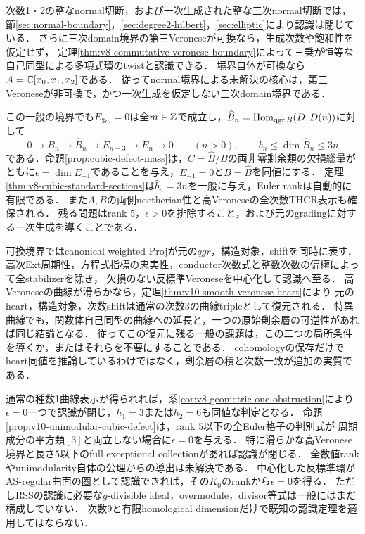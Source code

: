 \documentclass[11pt,a4paper]{ltjsarticle}
\begin{document}
次数1・2の整なnormal切断，および一次生成された整な三次normal切断では，
節\ref{sec:normal-boundary}，\ref{sec:degree2-hilbert}，\ref{sec:elliptic}により認識は閉じている．
さらに三次domain境界の第三Veroneseが可換なら，生成次数や飽和性を仮定せず，
定理\ref{thm:v8-commutative-veronese-boundary}によって三乗が恒等な自己同型による多項式環のtwistと認識できる．
境界自体が可換なら$A=\mathbb C[x_0,x_1,x_2]$である．
従ってnormal境界による未解決の核心は，第三Veroneseが非可換で，かつ一次生成を仮定しない三次domain境界である．

この一般の境界でも$E_{3m}=0$は全$m\in\mathbb Z$で成立し，$\widehat B_n=\operatorname{Hom}_{\operatorname{qgr} B}(D,D(n))$に対して
\[
 0\longrightarrow B_n\longrightarrow\widehat B_n
 \longrightarrow E_{n-3}\longrightarrow E_n\longrightarrow0\qquad(n>0),
 \qquad b_n\leq\dim\widehat B_n\leq3n
\]
である．命題\ref{prop:cubic-defect-mass}は，$C=\widehat B/B$の両非零剰余類の欠損総量が
ともに$\epsilon=\dim E_{-1}$であることを与え，$E_{-1}=0$と$B=\widehat B$を同値にする．
定理\ref{thm:v8-cubic-standard-sections}は$\widehat b_n=3n$を一般に与え，Euler rankは自動的に有限である．
また$A,B$の両側noetherian性と高Veroneseの全次数THCR表示も確保される．
残る問題はrank $5$，$\epsilon>0$を排除すること，および元のgradingに対する一次生成を導くことである．

可換境界ではcanonical weighted Projが元の$qgr$，構造対象，shiftを同時に表す．
高次Ext周期性，方程式指標の忠実性，conductor次数式と整数次数の偏極によって全stabilizerを除き，
欠損のない反標準Veroneseを中心化して認識へ至る．
高Veroneseの曲線が滑らかなら，定理\ref{thm:v10-smooth-veronese-heart}により
元のheart，構造対象，次数shiftは通常の次数3の曲線tripleとして復元される．
特異曲線でも，関数体自己同型の曲線への延長と，一つの原始剰余層の可逆性があれば同じ結論となる．
従ってこの復元に残る一般の課題は，この二つの局所条件を導くか，またはそれらを不要にすることである．
cohomologyの保存だけでheart同値を推論しているわけではなく，剰余層の積と次数一致が追加の実質である．

通常の種数1曲線表示が得られれば，系\ref{cor:v8-geometric-one-obstruction}により
$\epsilon=0$一つで認識が閉じ，$h_1=3$または$h_2=6$も同値な判定となる．
命題\ref{prop:v10-unimodular-cubic-defect}は，rank $5$以下の全Euler格子の判別式が
周期成分の平方類$[3]$と両立しない場合に$\epsilon=0$を与える．
特に滑らかな高Veronese境界と長さ$5$以下のfull exceptional collectionがあれば認識が閉じる．
全数値rankやunimodularity自体の公理からの導出は未解決である．
中心化した反標準環がAS-regular曲面の圏として認識できれば，その$K_0$のrankから$\epsilon=0$を得る．
ただしRSSの認識に必要な$g$-divisible ideal，overmodule，divisor等式は一般にはまだ構成していない．
次数9と有限homological dimensionだけで既知の認識定理を適用してはならない．
\end{document}
